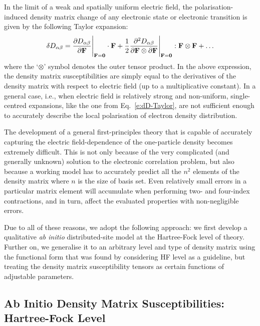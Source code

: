 \documentclass[aip,amsmath,amssymb,reprint,floatfix]{revtex4-1}
\begin{document}
In the limit of a weak and spatially uniform electric field,
the polarisation\hyp{}induced density matrix change of any electronic state
or electronic transition is given by the following Taylor expansion:
%
\begin{equation}\label{e:dD-Taylor}
 \delta D_{\alpha\beta} = \frac{\partial D_{\alpha\beta}}{\partial {\bf F}}\Bigg|_{{\bf F}={\bf 0}}  \cdot {\bf F} 
   + \frac{1}{2} 
     \frac{\partial^2 D_{\alpha\beta}}{\partial {\bf F} \otimes \partial {\bf F}}\Bigg|_{{\bf F}={\bf 0}} : {\bf F} \otimes {\bf F}
   + \ldots 
\end{equation}
%
where the `$\otimes$' symbol denotes the outer tensor product.
In the above expression, the density matrix susceptibilities 
are simply equal to the derivatives of the density matrix
with respect to electric field (up to a multiplicative constant).
In a general case, i.e., when electric field is relatively strong 
and non\hyp{}uniform, single\hyp{}centred expansions, like the one 
from Eq.~\eqref{e:dD-Taylor},
are not sufficient enough to accurately describe the local polarisation
of electron density distribution.

The development of a general first\hyp{}principles theory
that is capable of accurately capturing the electric field\hyp{}dependence 
of the one\hyp{}particle density becomes extremely difficult. This is not 
only because of the very complicated (and generally unknown) solution
to the electronic correlation problem, but also because a working model 
has to accurately predict all the $n^2$ elements of the density matrix
where $n$ is the size of basis set. Even relatively small errors
in a particular matrix element will accumulate when performing two\hyp{}
and four\hyp{}index contractions, and in turn, affect the evaluated properties 
with non\hyp{}negligible errors. 

Due to all of these reasons, we adopt the following approach: 
we first develop a qualitative \emph{ab initio} distributed\hyp{}site 
model at the Hartree\hyp{}Fock level of theory. Further on, we generalise it 
to an arbitrary level and type of density matrix
using the functional form that was found by considering HF level as a guideline,
but treating the density matrix susceptibility tensors as certain functions 
of adjustable parameters.

\subsection{Ab Initio Density Matrix Susceptibilities: Hartree-Fock Level}
\end{document}
